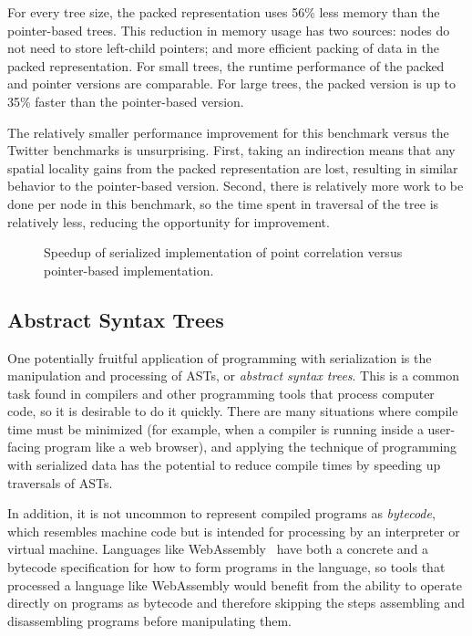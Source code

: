 For every tree size, the packed representation uses 56\% less memory
than the pointer-based trees. This reduction in memory usage has two
sources: nodes do not need to store left-child pointers; and more
efficient packing of data in the packed representation. For small
trees, the runtime performance of the packed and pointer versions are
comparable. For large trees, the packed version is up to 35\% faster
than the pointer-based version.

The relatively smaller performance improvement for this
benchmark versus the Twitter benchmarks is unsurprising. First, taking an
indirection means that any spatial locality gains from the packed
representation are lost, resulting in similar behavior to the
pointer-based version. Second, there is relatively more work to be
done per node in this benchmark, so the time spent in traversal of the
tree is relatively less, reducing the opportunity for improvement.


\begin{figure}
  \centering
  
  \caption{Speedup of serialized implementation of point correlation versus
    pointer-based implementation.}
  \label{fig:point_corr_plot}
\end{figure}

\subsection{Abstract Syntax Trees}\label{subsec:ast}

One potentially fruitful application of programming with serialization is
the manipulation and processing of ASTs, or \emph{abstract syntax trees}.
This is a common task found in compilers and other programming tools that
process computer code, so it is desirable to do it quickly. There are many
situations where compile time must be minimized (for example, when a compiler
is running inside a user-facing program like a web browser), and applying
the technique of programming with serialized data has the potential to reduce
compile times by speeding up traversals of ASTs.

In addition,
it is not uncommon to represent compiled programs as \emph{bytecode}, which
resembles machine code but is intended for processing by an interpreter or
virtual machine. Languages like WebAssembly~\cite{webassembly} have
both a concrete and a bytecode specification for how to form programs
in the language, so tools that processed a language like WebAssembly would benefit
from the ability to operate directly on programs as bytecode and therefore
skipping the steps assembling and disassembling programs before manipulating them.

